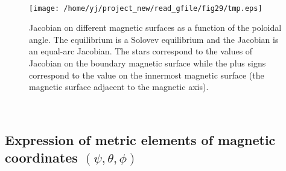 \documentclass{article}
\begin{document}
\

\begin{figure}[h]
  \texttt{[image: /home/yj/project\_new/read\_gfile/fig29/tmp.eps]}
  \caption{Jacobian on different magnetic surfaces as a function of the
  poloidal angle. The equilibrium is a Solovev equilibrium and the Jacobian is
  an equal-arc Jacobian. The stars correspond to the values of Jacobian on the
  boundary magnetic surface while the plus signs correspond to the value on
  the innermost magnetic surface (the magnetic surface adjacent to the
  magnetic axis).}
\end{figure}

\

\subsection{Expression of metric elements of magnetic coordinates $(\psi,
\theta, \phi)$}
\end{document}
